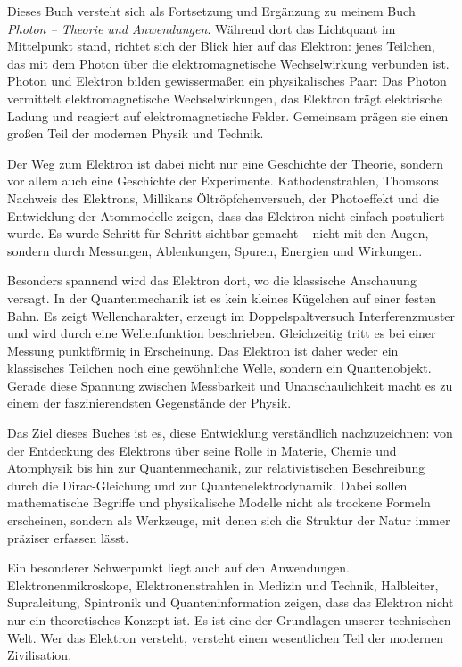 Dieses Buch versteht sich als Fortsetzung und Ergänzung zu meinem Buch \emph{Photon -- Theorie und Anwendungen}. 
Während dort das Lichtquant im Mittelpunkt stand, richtet sich der Blick hier auf das Elektron: jenes Teilchen, das mit dem Photon über die elektromagnetische Wechselwirkung verbunden ist. 
Photon und Elektron bilden gewissermaßen ein physikalisches Paar: Das Photon vermittelt elektromagnetische Wechselwirkungen, das Elektron trägt elektrische Ladung und reagiert auf elektromagnetische Felder. 
Gemeinsam prägen sie einen großen Teil der modernen Physik und Technik.

Der Weg zum Elektron ist dabei nicht nur eine Geschichte der Theorie, sondern vor allem auch eine Geschichte der Experimente. 
Kathodenstrahlen, Thomsons Nachweis des Elektrons, Millikans Öltröpfchenversuch, der Photoeffekt und die Entwicklung der Atommodelle zeigen, dass das Elektron nicht einfach postuliert wurde. 
Es wurde Schritt für Schritt sichtbar gemacht -- nicht mit den Augen, sondern durch Messungen, Ablenkungen, Spuren, Energien und Wirkungen.

Besonders spannend wird das Elektron dort, wo die klassische Anschauung versagt. 
In der Quantenmechanik ist es kein kleines Kügelchen auf einer festen Bahn. 
Es zeigt Wellencharakter, erzeugt im Doppelspaltversuch Interferenzmuster und wird durch eine Wellenfunktion beschrieben. 
Gleichzeitig tritt es bei einer Messung punktförmig in Erscheinung. 
Das Elektron ist daher weder ein klassisches Teilchen noch eine gewöhnliche Welle, sondern ein Quantenobjekt. 
Gerade diese Spannung zwischen Messbarkeit und Unanschaulichkeit macht es zu einem der faszinierendsten Gegenstände der Physik.

Das Ziel dieses Buches ist es, diese Entwicklung verständlich nachzuzeichnen: von der Entdeckung des Elektrons über seine Rolle in Materie, Chemie und Atomphysik bis hin zur Quantenmechanik, zur relativistischen Beschreibung durch die Dirac-Gleichung und zur Quantenelektrodynamik. 
Dabei sollen mathematische Begriffe und physikalische Modelle nicht als trockene Formeln erscheinen, sondern als Werkzeuge, mit denen sich die Struktur der Natur immer präziser erfassen lässt.

Ein besonderer Schwerpunkt liegt auch auf den Anwendungen. 
Elektronenmikroskope, Elektronenstrahlen in Medizin und Technik, Halbleiter, Supraleitung, Spintronik und Quanteninformation zeigen, dass das Elektron nicht nur ein theoretisches Konzept ist. 
Es ist eine der Grundlagen unserer technischen Welt. 
Wer das Elektron versteht, versteht einen wesentlichen Teil der modernen Zivilisation.

